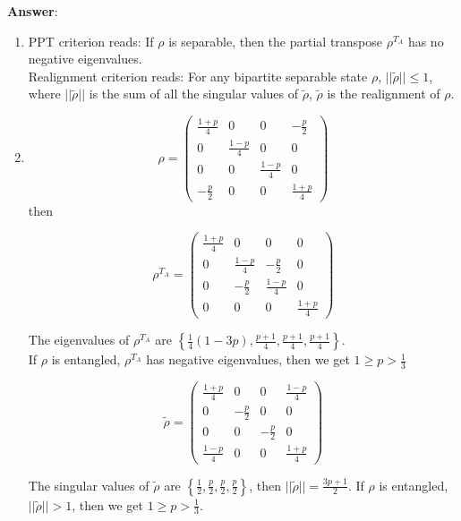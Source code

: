 \documentclass[english,aps,onecolumn]{revtex4-1}
\begin{document}
\begin{enumerate}[1.]
\textbf{Answer}:
\begin{enumerate}[(1)]
	\item
PPT criterion reads:
If $\rho$ is separable, then the partial transpose $\rho^{T_A}$ has no negative eigenvalues. \\
Realignment criterion reads:
For any bipartite separable state $\rho$, $||\tilde{\rho}|| \leq 1$, where $||\tilde{\rho}||$ is the sum of all the singular values of $\tilde{\rho}$, $\tilde{\rho}$ is the realignment of $\rho$.
	\item
$$
\rho=
\begin{pmatrix}
\frac{1+p}{4} & 0 & 0 & -\frac{p}{2} \\
0 & \frac{1-p}{4} & 0 & 0 \\
0 & 0 & \frac{1-p}{4} & 0 \\
-\frac{p}{2} & 0 & 0 & \frac{1+p}{4}
\end{pmatrix}
$$
then

$$
\rho^{T_A} =
\begin{pmatrix}
\frac{1+p}{4} & 0 & 0 & 0 \\
0 & \frac{1-p}{4} & -\frac{p}{2} & 0 \\
0 & -\frac{p}{2} & \frac{1-p}{4} & 0 \\
0 & 0 & 0 & \frac{1+p}{4}
\end{pmatrix}
$$

The eigenvalues of $\rho^{T_A}$ are $\left\{\frac{1}{4} (1-3 p),\frac{p+1}{4},\frac{p+1}{4},\frac{p+1}{4}\right\}$.\\
If $\rho$ is entangled, $\rho^{T_A}$ has negative eigenvalues, then we get $1\geq p > \frac{1}{3}$

$$
\tilde{\rho}=
\begin{pmatrix}
\frac{1+p}{4} & 0 & 0 & \frac{1-p}{4} \\
0 & -\frac{p}{2} & 0 & 0 \\
0 & 0 & -\frac{p}{2} & 0 \\
\frac{1-p}{4} & 0 & 0 & \frac{1+p}{4}
\end{pmatrix}
$$

The singular values of $\tilde{\rho}$ are $\left\{\frac{1}{2} ,\frac{p}{2},\frac{p}{2},\frac{p}{2}\right\}$,
then $||\tilde{\rho}|| = \frac{3p+1}{2}$.
If $\rho$ is entangled, $||\tilde{\rho}|| > 1$, then we get $1\geq p > \frac{1}{3}$.

 \end{enumerate}


\end{enumerate}
\end{document}
